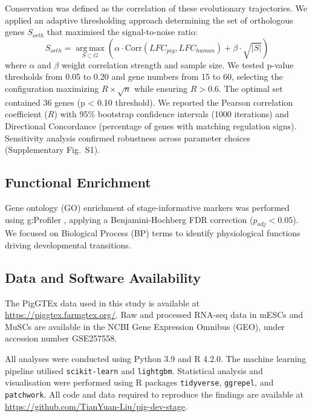 Conservation was defined as the correlation of these evolutionary trajectories. We applied an adaptive thresholding approach determining the set of orthologous genes $S_{orth}$ that maximised the signal-to-noise ratio:
\begin{equation}
S_{orth} = \operatorname*{arg\,max}_{S \subset G} \left( \alpha \cdot \text{Corr}(LFC_{pig}, LFC_{human}) + \beta \cdot \sqrt{|S|} \right)
\end{equation}
where $\alpha$ and $\beta$ weight correlation strength and sample size. We tested p-value thresholds from 0.05 to 0.20 and gene numbers from 15 to 60, selecting the configuration maximizing $R \times \sqrt{n}$ while ensuring $R > 0.6$. The optimal set contained 36 genes (p < 0.10 threshold). We reported the Pearson correlation coefficient ($R$) with 95\% bootstrap confidence intervals (1000 iterations) and Directional Concordance (percentage of genes with matching regulation signs). Sensitivity analysis confirmed robustness across parameter choices (Supplementary Fig.~S1).

\subsection{Functional Enrichment}
Gene ontology (GO) enrichment of stage-informative markers was performed using g:Profiler \cite{kolberg2023gprofiler}, applying a Benjamini-Hochberg FDR correction ($p_{adj} < 0.05$). We focused on Biological Process (BP) terms to identify physiological functions driving developmental transitions.

\subsection{Data and Software Availability}
The PigGTEx data used in this study is available at \url{https://piggtex.farmgtex.org/}. Raw and processed RNA-seq data in mESCs and MuSCs are available in the NCBI Gene Expression Omnibus (GEO), under accession number GSE257558.

All analyses were conducted using Python 3.9 and R 4.2.0. The machine learning pipeline utilised \texttt{scikit-learn} and \texttt{lightgbm}. Statistical analysis and visualisation were performed using R packages \texttt{tidyverse}, \texttt{ggrepel}, and \texttt{patchwork}. All code and data required to reproduce the findings are available at \url{https://github.com/TianYuan-Liu/pig-dev-stage}.